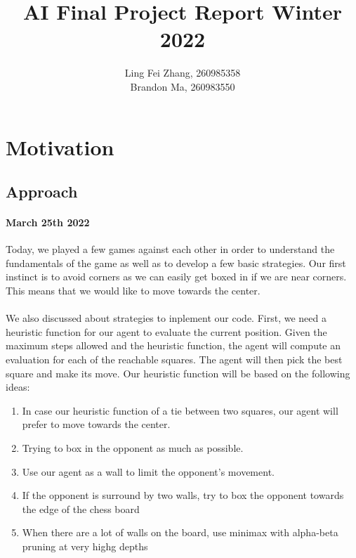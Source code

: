 \documentclass[12pt,a4paper]{article}
\author{Ling Fei Zhang, 260985358\\
Brandon Ma, 260983550}
\begin{document}
\title{AI Final Project Report Winter 2022}    
\maketitle
\section{Motivation}
\subsection{Approach}
\paragraph{March 25th 2022}
Today, we played a few games against each other in order to understand the fundamentals 
of the game as well as to develop a few basic strategies. Our first instinct is to avoid 
corners as we can easily get boxed in if we are near corners. This means that we would 
like to move towards the center. 
\paragraph{} We also discussed about strategies to inplement our code. First, we need a 
heuristic function for our agent to evaluate the current position. Given the maximum steps 
allowed and the heuristic function, the agent will compute an evaluation for each of the 
reachable squares. The agent will then pick the best square and make its move. Our heuristic 
function will be based on the following ideas:
\begin{enumerate}
    \item In case our heuristic function of a tie between two squares, our agent will prefer to move towards the center.
    \item Trying to box in the opponent as much as possible.
    \item Use our agent as a wall to limit the opponent's movement.
    \item If the opponent is surround by two walls, try to box the opponent towards the edge of the chess board
    \item When there are a lot of walls on the board, use minimax with alpha-beta pruning at very highg depths
\end{enumerate}
\end{document}
